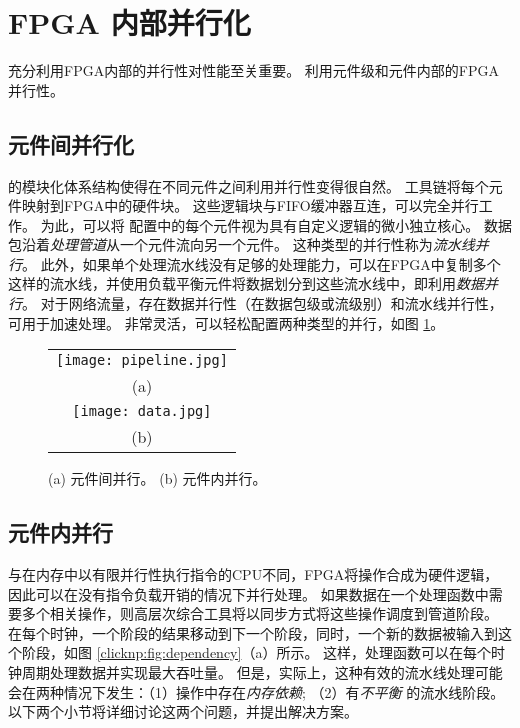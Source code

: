 \section{FPGA 内部并行化}
\label{clicknp:sec:optimization}

充分利用FPGA内部的并行性对性能至关重要。
\name 利用元件级和元件内部的FPGA并行性。

\subsection{元件间并行化}
\name 的模块化体系结构使得在不同元件之间利用并行性变得很自然。
\name 工具链将每个元件映射到FPGA中的硬件块。
这些逻辑块与FIFO缓冲器互连，可以完全并行工作。
为此，可以将 \name 配置中的每个元件视为具有自定义逻辑的微小独立核心。
数据包沿着\textit {处理管道}从一个元件流向另一个元件。
这种类型的并行性称为\textit {流水线并行}。
此外，如果单个处理流水线没有足够的处理能力，可以在FPGA中复制多个这样的流水线，并使用负载平衡元件将数据划分到这些流水线中，即利用\textit{数据并行}。
对于网络流量，存在数据并行性（在数据包级或流级别）和流水线并行性，可用于加速处理。
\name 非常灵活，可以轻松配置两种类型的并行，如图 \ref{clicknp:fig:element-para}。

\begin{figure}
\centering
\begin{tabular}{c}
\texttt{[image: pipeline.jpg]}\\
(a)\\
\texttt{[image: data.jpg]}\\
(b)\\
\end{tabular}
\caption{(a) 元件间并行。 (b) 元件内并行。}
\label{clicknp:fig:element-para}
\end{figure}

\subsection{元件内并行}
\label{clicknp:subsec:paral_in_elem}

与在内存中以有限并行性执行指令的CPU不同，FPGA将操作合成为硬件逻辑，因此可以在没有指令负载开销的情况下并行处理。
如果数据在一个处理函数中需要多个相关操作，则高层次综合工具将以同步方式将这些操作调度到管道阶段。
在每个时钟，一个阶段的结果移动到下一个阶段，同时，一个新的数据被输入到这个阶段，如图 \ref{clicknp:fig:dependency}（a）所示。
这样，处理函数可以在每个时钟周期处理数据并实现最大吞吐量。
但是，实际上，这种有效的流水线处理可能会在两种情况下发生：（1）操作中存在\textit {内存依赖}; （2）有\textit {不平衡} 的流水线阶段。
以下两个小节将详细讨论这两个问题，并提出解决方案。



